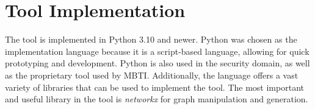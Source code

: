 \section{Tool Implementation}
\label{sec:implementation}

The tool is implemented in Python 3.10 and newer.
Python was chosen as the implementation language because it is a script-based language, allowing for quick prototyping and development.
Python is also used in the security domain, as well as the proprietary tool used by MBTI.
Additionally, the language offers a vast variety of libraries that can be used to implement the tool.
The most important and useful library in the tool is \textit{networkx} for graph manipulation and generation.

